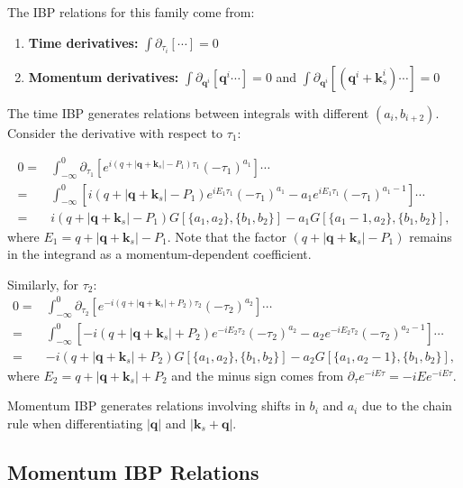 \documentclass[a4paper,12pt]{article}
\def\pd{\partial}
\begin{document}
The IBP relations for this family come from:
\begin{enumerate}
	\item \textbf{Time derivatives:} $\int \pd_{\tau_i} [\cdots] = 0$
	\item \textbf{Momentum derivatives:} $\int \pd_{\bm q^i} [\bm q^i \cdots] = 0$ and $\int \pd_{\bm q^i} [(\bm q^i+\bm k_s^i) \cdots] = 0$
\end{enumerate}

The time IBP generates relations between integrals with different $(a_i, b_{i+2})$. Consider the derivative with respect to $\tau_1$:

\begin{equation}
	\begin{split}
		0 = & \int_{-\infty}^0 \pd_{\tau_1} \left[ e^{i(q+|\bm q+\bm k_s|-P_1)\tau_1} (-\tau_1)^{a_1} \right] \cdots                                \\
		=   & \int_{-\infty}^0 \left[ i(q+|\bm q+\bm k_s|-P_1) e^{iE_1\tau_1} (-\tau_1)^{a_1} - a_1 e^{iE_1\tau_1} (-\tau_1)^{a_1-1} \right] \cdots \\
		=   & i(q+|\bm q+\bm k_s|-P_1) G[\{a_1,a_2\},\{b_1,b_2\}] - a_1 G[\{a_1-1,a_2\},\{b_1,b_2\}],
	\end{split}
\end{equation}
where $E_1 = q+|\bm q+\bm k_s|-P_1$. Note that the factor $(q+|\bm q+\bm k_s|-P_1)$ remains in the integrand as a momentum-dependent coefficient.

Similarly, for $\tau_2$:
\begin{equation}
	\begin{split}
		0 = & \int_{-\infty}^0 \pd_{\tau_2} \left[ e^{-i(q+|\bm q+\bm k_s|+P_2)\tau_2} (-\tau_2)^{a_2} \right] \cdots                                  \\
		=   & \int_{-\infty}^0 \left[ -i(q+|\bm q+\bm k_s|+P_2) e^{-iE_2\tau_2} (-\tau_2)^{a_2} - a_2 e^{-iE_2\tau_2} (-\tau_2)^{a_2-1} \right] \cdots \\
		=   & -i(q+|\bm q+\bm k_s|+P_2) G[\{a_1,a_2\},\{b_1,b_2\}] - a_2 G[\{a_1,a_2-1\},\{b_1,b_2\}],
	\end{split}
\end{equation}
where $E_2 = q+|\bm q+\bm k_s|+P_2$ and the minus sign comes from $\pd_{\tau} e^{-iE\tau} = -iE e^{-iE\tau}$.

Momentum IBP generates relations involving shifts in $b_i$ and $a_i$ due to the chain rule when differentiating $|\bm q|$ and $|\bm k_s+\bm q|$.

\subsection{Momentum IBP Relations}
\end{document}

